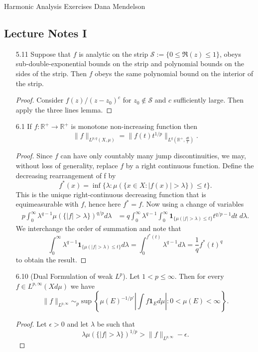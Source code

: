 \documentclass[11pt]{article}
\theoremstyle{remark}
\newcommand{\1}{\textbf{1}}
\def\norm#1{\| #1  \|}
\newcommand{\bbR}{\mathbb{R}}
\begin{document}
{\noindent\Large Harmonic Analysis Exercises \hfill Dana Mendelson}
\vspace{6mm}
\subsection*{Lecture Notes I}
\begin{enumerate}
\item[5.11] Suppose that $f$ is analytic on the strip $\mathcal{S} := \{0 \leq \Re(z) \leq 1\}$, obeys sub-double-exponential bounds on the strip and polynomial bounds on the sides of the strip. Then $f$ obeys the same polynomial bound on the interior of the strip.
\begin{proof}
Consider $f(z)/(z-z_0)^c$ for $z_0 \not\in \mathcal{S}$ and $c$ sufficiently large. Then apply the three lines lemma.
\end{proof}
\item[6.1] If $f : \bbR^+ \to \bbR^+$ is monotone non-increasing function then
\[
\norm{f}_{L^{p,q}(X, \mu)} = \norm{f(t) t^{1/p} }_{L^q(\bbR^+, \frac{dt}{t})}.
\]
\begin{proof}
Since $f$ can have only countably many jump discontinuities, we may, without loss of generality, replace $f$ by a right continuous function. Define the decreasing rearrangement of f by
\[
f^*(x) = \inf \{\lambda : \mu(\{x \in X: |f(x)| > \lambda\}) \leq t\}.
\]
This is the unique right-continuous decreasing function that is equimeasurable with $f$, hence here $f^*  = f$. Now using a change of variables
\begin{align*}
p \int_0^\infty \lambda^{q-1} \mu(\{ |f| > \lambda\})^{q/p} d\lambda &= q \int_0^\infty  \lambda^{q-1} \int_0^\infty \textbf{1}_{\{\mu( |f| > \lambda) \leq t\}} t^{q/p - 1} dt\; d\lambda.
\end{align*}
We interchange the order of summation and note that
\[
\int_0^\infty \lambda^{q-1} \textbf{1}_{\{\mu( |f| > \lambda) \leq t\}} d\lambda = \int_0^{f^*(t)} \lambda^{q-1} d\lambda = \frac{1}{q} f^*(t)^q
\]
to obtain the result.
\end{proof}
\item[6.10] (Dual Formulation of weak $L^p$). Let $1 < p \leq \infty$. Then for every $f \in L^{p, \infty}(X d\mu)$ we have
\[
\norm{f}_{L^{p, \infty}} \sim_p \sup\left\{ \mu(E)^{-1/p'} \left| \int f \textbf{1}_E d\mu \right| : 0 < \mu(E) < \infty\right\}.
\]
\begin{proof} 
Let $\epsilon > 0$ and let $\lambda$ be such that
\[
\lambda \mu(\{|f| > \lambda \})^{1/p} > \norm{f}_{L^{p,\infty}} - \epsilon.
\]
\end{proof}
\end{enumerate}
\end{document}
